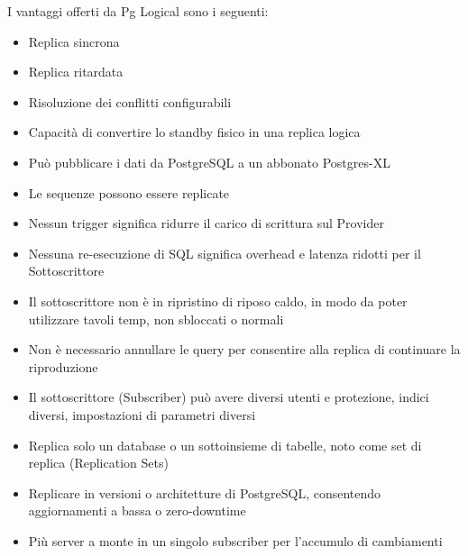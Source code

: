 I vantaggi offerti da Pg Logical sono i seguenti:
\begin{itemize}
\item
Replica sincrona
\item
Replica ritardata
\item
Risoluzione dei conflitti configurabili
\item
Capacit\`{a} di convertire lo standby fisico in una replica logica
\item
Pu\`{o} pubblicare i dati da PostgreSQL a un abbonato Postgres-XL
\item
Le sequenze possono essere replicate
\item
Nessun trigger significa ridurre il carico di scrittura sul Provider
\item
Nessuna re-esecuzione di SQL significa overhead e latenza ridotti per il Sottoscrittore
\item
Il sottoscrittore non \`{e} in ripristino di riposo caldo, in modo da poter utilizzare tavoli temp, non sbloccati o normali
\item
Non \`{e} necessario annullare le query per consentire alla replica di continuare la riproduzione
\item
Il sottoscrittore (Subscriber) pu\`{o} avere diversi utenti e protezione, indici diversi, impostazioni di parametri diversi
\item
Replica solo un database o un sottoinsieme di tabelle, noto come set di replica (Replication Sets)
\item
Replicare in versioni o architetture di PostgreSQL, consentendo aggiornamenti a bassa o zero-downtime
\item
Pi\`{u} server a monte in un singolo subscriber per l'accumulo di cambiamenti
\end{itemize}

